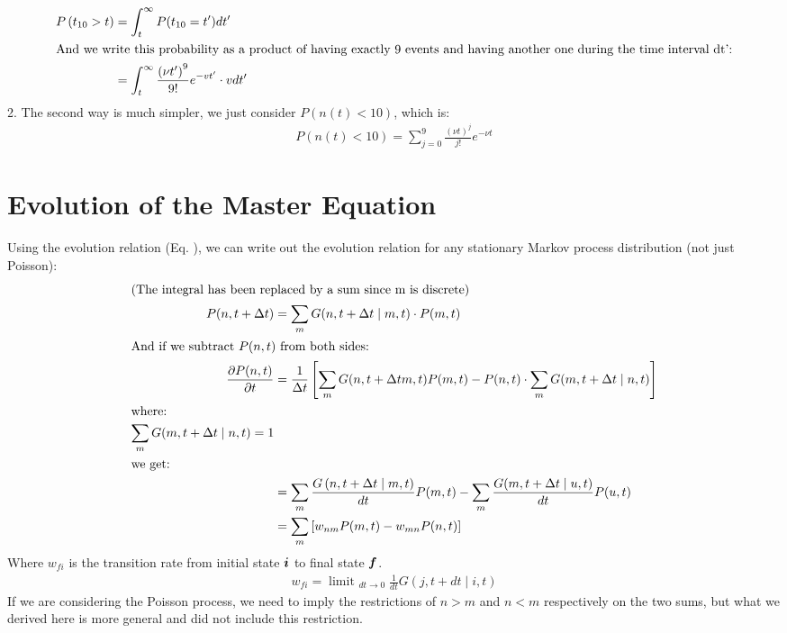\documentclass{report}
\begin{document}
\begin{align}
    P\left(t_{10}>t\right) & =\int_t^{\infty} P(t_{10}=t')dt'                                                                  \\
    \intertext{And we write this probability as a product of having exactly 9 events and having another one during the time interval dt':}
                           & =\int_t^{\infty} \frac{\left(\nu t^{\prime}\right)^9}{9 !} e^{-v t^{\prime}} \cdot v d t^{\prime}
\end{align}
2. The second way is much simpler, we just consider $P(n(t)<10)$, which is:
\begin{align}
    P(n(t)<10) = \sum_{j=0}^9 \frac{(\nu t)^j}{j !} e^{-\nu t}
\end{align}
\section{Evolution of the Master Equation}
Using the evolution relation (Eq. ), we can write out the evolution relation for any stationary Markov process distribution (not just Poisson):
\begin{align}
    \intertext{(The integral has been replaced by a sum since m is discrete)}
    P(n, t+\Delta t)                    & =\sum_m G(n, t+\Delta t \mid m, t) \cdot P(m, t)                                                                        \\
    \intertext{And if we subtract $P(n,t)$ from both sides:}
    \frac{\partial P(n, t)}{\partial t} & =\frac{1}{\Delta t}\left[\sum_m G(n, t+\Delta t m, t) P(m, t)
    -P(n, t) \cdot \sum_m G(m, t+ \Delta t \mid n, t)\right]                                                                                                      \\
    \intertext{where:}
    \sum_m G(m, t+ \Delta t \mid n, t) = 1                                                                                                                        \\
    \intertext{we get:}
                                        & =\sum_m \frac{G\left(n, t+\Delta t \mid m, t\right)}{d t} P(m, t)-\sum_m \frac{G(m, t+\Delta t \mid u, t)}{d t} P(u, t) \\
                                        & =\sum_m\left[w_{n m} P(m, t)-w_{m n} P(n, t)\right]
\end{align}
Where $w_{fi}$ is the transition rate from initial state $\boldsymbol{i}$ to final state $\boldsymbol{f}$.
\begin{align}
    w_{fi}=\operatorname{limit~}_{d t \rightarrow 0} \frac{1}{d t} G(j, t+d t \mid i, t)
\end{align}
If we are considering the Poisson process, we need to imply the restrictions of $n > m$ and $n < m$ respectively on the two sums, but what we derived here is more general and did not include this restriction.
\end{document}
